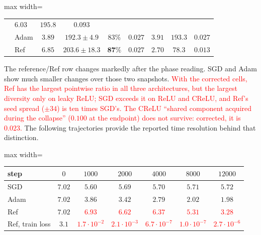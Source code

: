 \documentclass{article}
\newcommand{\nat}[1]{\textcolor{red}{#1}}
\theoremstyle{definition}
\theoremstyle{remark}
\begin{document}
\begin{center}
\begin{adjustbox}{max width=\linewidth}
\begin{tabular}{llcccc|ccc}
                         & $6.03$          & $195.8$                   & $0.093$ \\
      & Adam             & $3.89$          & $192.3 \pm 4.9$           & $83\%$          & $0.027$
                         & $3.91$          & $193.3$                   & $0.027$ \\
      & Ref        & $\mathbf{6.85}$ & $\mathbf{203.6 \pm 18.3}$ & $\mathbf{87\%}$ & $0.027$
                         & $2.70$          & $78.3$                    & $0.013$ \\
\bottomrule
\end{tabular}
\end{adjustbox}
\end{center}

The reference/Ref row changes markedly after the phase reading. SGD and Adam show much smaller changes over those two snapshots. \nat{With the corrected cells, Ref has the largest pointwise ratio in all three architectures, but the largest diversity only on leaky ReLU; SGD exceeds it on ReLU and CReLU, and Ref's seed spread ($\pm34$) is ten times SGD's. The CReLU ``shared component acquired during the collapse'' ($0.100$ at the endpoint) does not survive: corrected, it is $0.023$.} The following trajectories provide the reported time resolution behind that distinction.

\begin{center}\small
\begin{adjustbox}{max width=\linewidth}
\begin{tabular}{lcccccc}
\toprule
step & $0$ & $1000$ & $2000$ & $4000$ & $8000$ & $12000$ \\
\midrule
SGD & $7.02$ & $5.60$ & $5.69$ & $5.70$ & $5.71$ & $5.72$ \\
Adam             & $7.02$ & $3.86$ & $3.42$ & $2.79$ & $2.02$ & $1.98$ \\
Ref        & $7.02$ & \nat{$\mathbf{6.93}$} & \nat{$\mathbf{6.62}$} & \nat{$\mathbf{6.37}$} & \nat{$5.31$} & \nat{$3.28$} \\
\midrule
Ref, train loss & $3.1$ & \nat{$1.7\cdot10^{-2}$} & \nat{$2.1\cdot10^{-3}$} & \nat{$6.7\cdot10^{-7}$}
 & \nat{$1.0\cdot10^{-7}$} & \nat{$2.7\cdot10^{-6}$} \\
\bottomrule
\end{tabular}
\end{adjustbox}
\end{center}
\end{document}
